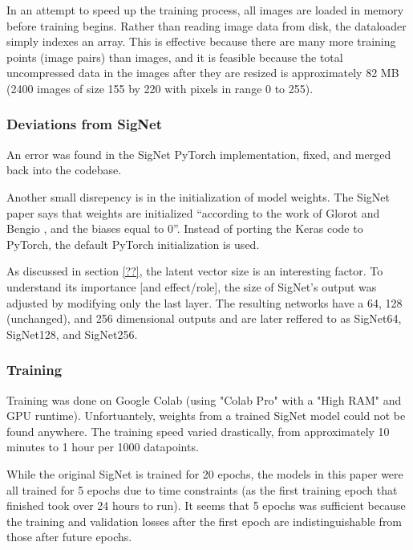 In an attempt to speed up the training process, all images are loaded in memory before training begins.
Rather than reading image data from disk, the dataloader simply indexes an array.
This is effective because there are many more training points (image pairs) than images, and it is feasible because the total uncompressed data in the images after they are resized is approximately 82 MB (2400 images of size 155 by 220 with pixels in range 0 to 255).

\subsubsection{Deviations from SigNet}
An error was found in the SigNet PyTorch implementation, fixed, and merged back into the codebase.

Another small disrepency is in the initialization of model weights.
The SigNet paper says that weights are initialized ``according to the work
of Glorot and Bengio \cite{glorot_bengio}, and the biases equal to 0''\cite{sig_net}.
Instead of porting the Keras code to PyTorch, the default PyTorch initialization is used.


As discussed in section \ref{??}, the latent vector size is an interesting factor.
To understand its importance [and effect/role], the size of SigNet's output was adjusted by modifying only the last layer.
The resulting networks have a 64, 128 (unchanged), and 256 dimensional outputs and are later reffered to as SigNet64, SigNet128, and SigNet256.

\subsubsection{Training}
Training was done on Google Colab (using "Colab Pro" with a "High RAM" and GPU runtime).
Unfortuantely, weights from a trained SigNet model could not be found anywhere.
The training speed varied drastically, from approximately 10 minutes to 1 hour per 1000 datapoints.

While the original SigNet is trained for 20 epochs, the models in this paper were all trained for 5 epochs due to time constraints (as the first training epoch that finished took over 24 hours to run).
It seems that 5 epochs was sufficient because the training and validation losses after the first epoch are indistinguishable from those after future epochs.

